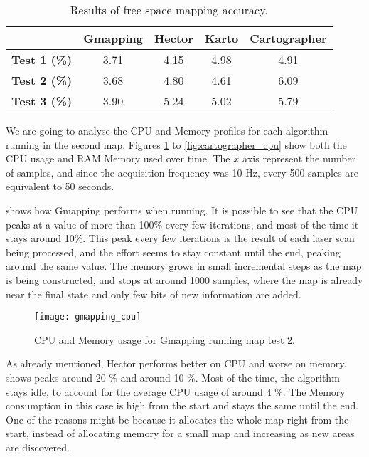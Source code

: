 \begin{table}[!ht]
\centering
\renewcommand*{\arraystretch}{1.1}
\begin{tabular}{c|c|c|c|c}
& \textbf{Gmapping} & \textbf{Hector} & \textbf{Karto} & \textbf{Cartographer} \\ \hline
\textbf{Test 1 (\%)} & 3.71 & 4.15 & 4.98 & 4.91 \\
\textbf{Test 2 (\%)} & 3.68 & 4.80 & 4.61 & 6.09 \\
\textbf{Test 3 (\%)} & 3.90 & 5.24 & 5.02 & 5.79 \\
 \hline
\end{tabular}
\caption{Results of free space mapping accuracy.}
\label{tab:results_whitespace}
\end{table}

We are going to analyse the CPU and Memory profiles for each algorithm running in the second map. Figures \ref{fig:gmapping_cpu} to \ref{fig:cartographer_cpu} show both the CPU usage and RAM Memory used over time. The $x$ axis represent the number of samples, and since the acquisition frequency was 10 Hz, every 500 samples are equivalent to 50 seconds.

 shows how Gmapping performs when running. It is possible to see that the CPU peaks at a value of more than 100\% every few iterations, and most of the time it stays around 10\%. This peak every few iterations is the result of each laser scan being processed, and the effort seems to stay constant until the end, peaking around the same value. The memory grows in small incremental steps as the map is being constructed, and stops at around 1000 samples, where the map is already near the final state and only few bits of new information are added.

\begin{figure}[!ht]
    \centering
    \texttt{[image: gmapping\_cpu]}
    \caption{CPU and Memory usage for Gmapping running map test 2.}
    \label{fig:gmapping_cpu}
\end{figure}

As already mentioned, Hector performs better on CPU and worse on memory.  shows peaks around 20 \% and around 10 \%. Most of the time, the algorithm stays idle, to account for the average CPU usage of around 4 \%. The Memory consumption in this case is high from the start and stays the same until the end. One of the reasons might be because it allocates the whole map right from the start, instead of allocating memory for a small map and increasing as new areas are discovered.


